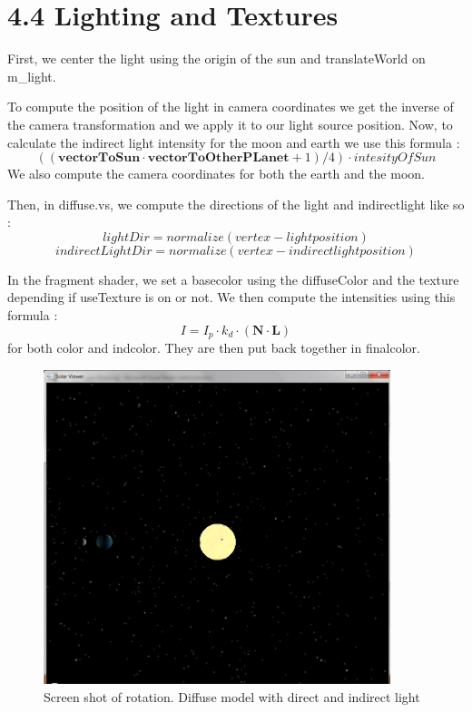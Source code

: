 \documentclass[10pt,a4paper]{report}
\begin{document}
\newpage 
\section*{4.4   Lighting and Textures}
First, we center the light using the origin of the sun and translateWorld on m\_light.

To compute the position of the light in camera coordinates we get the inverse of the camera transformation and we apply it to our light source position. Now, to calculate the indirect light intensity for the moon and earth we use this formula : $$((\mathbf{vectorToSun} \cdot \mathbf{vectorToOtherPLanet} + 1)/4) \cdot intesityOfSun$$
We also compute the camera coordinates for both the earth and the moon.

Then, in diffuse.vs, we compute the directions of the light and indirectlight like so :
$$lightDir = normalize(vertex - lightposition)$$
$$indirectLightDir = normalize(vertex - indirectlightposition)$$

In the fragment shader, we set a basecolor using the diffuseColor and the texture depending if useTexture is on or not. We then compute the intensities using this formula : $$I = I_p \cdot k_d \cdot (\mathbf{N} \cdot \mathbf{L})$$
for both color and indcolor. They are then put back together in finalcolor.

\begin{figure}[h!]
\caption{Screen shot of rotation. Diffuse model with direct and indirect light}
  \centering
    \includegraphics[width=0.9\textwidth]{im_4_3_4_4.png}
\end{figure}
\end{document}
